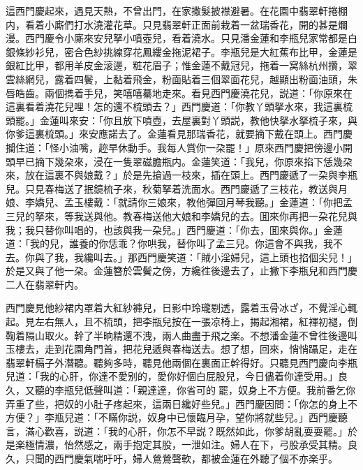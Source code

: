 這西門慶起來，遇見天熱，不曾出門，在家撒髮披襟避暑。在花園中翡翠軒捲棚内，看着小廝們打水澆灌花草。只見翡翠軒正面前栽着一盆瑞香花，開的甚是爛漫。西門慶令小廝來安兒拏小噴壺兒，看着澆水。只見潘金蓮和李瓶兒家常都是白銀條紗衫兒，密合色紗挑線穿花鳳縷金拖泥裙子。李瓶兒是大紅蕉布比甲，金蓮是銀紅比甲，都用羊皮金滚邊，粧花眉子；惟金蓮不戴冠兒，拖着一窝絲杭州攢，翠雲絲網兒，露着四鬢，上黏着飛金，粉面貼着三個翠面花兒，越顯出粉面油頭，朱唇皓齒。兩個擕着手兒，笑嘻嘻驀地走來。看見西門慶澆花兒，説道：「你原來在這裏看着澆花兒哩！怎的還不梳頭去？」西門慶道：「你教丫頭拏水來，我這裏梳頭罷。」金蓮叫來安：「你且放下噴壺，去屋裏對丫頭説，教他快拏水拏梳子來，與你爹這裏梳頭。」來安應諾去了。金蓮看見那瑞香花，就要摘下戴在頭上。西門慶攔住道：「怪小油嘴，趂早休動手。我每人賞你一朶罷！」原來西門慶把傍邊小開頭早已摘下幾朶來，浸在一隻翠磁膽瓶内。金蓮笑道：「我兒，你原來掐下恁幾朶來，放在這裏不與娘戴？」於是先搶過一枝來，插在頭上。西門慶遞了一朶與李瓶兒。只見春梅送了抿鏡梳子來，秋菊拏着洗面水。西門慶遞了三枝花，教送與月娘、李嬌兒、孟玉樓戴：「就請你三娘來，教他彈回月琴我聽。」金蓮道：「你把孟三兒的拏來，等我送與他。教春梅送他大娘和李嬌兒的去。囬來你再把一朶花兒與我；我只替你叫唱的，也該與我一朶兒。」西門慶道：「你去，囬來與你。」金蓮道：「我的兒，誰養的你恁乖？你哄我，替你叫了孟三兒。你這會不與我，我不去。你與了我，我纔叫去。」那西門慶笑道：「賊小淫婦兒，這上頭也掐個尖兒！」於是又與了他一朶。金蓮簪於雲鬢之傍，方纔徃後邊去了，止撇下李瓶兒和西門慶二人在翡翠軒内。

西門慶見他紗裙内罩着大紅紗褲兒，日影中玲瓏剔透，露着玉骨冰ざ，不覺淫心輒起。見左右無人，且不梳頭，把李瓶兒按在一張凉椅上，揭起湘裙，紅褌初褪，倒鞠着隔山取火。幹了半晌精還不洩，兩人曲盡于飛之楽。不想潘金蓮不曾徃後邊叫玉樓去，走到花園角門首，把花兒遞與春梅送去。想了想，回來，悄悄躡足，走在翡翠軒槅子外潛聽。聽夠多時，聽見他兩個在裏面正幹得好。只聽見西門慶向李瓶兒道：「我的心肝，你達不愛别的，愛你好個白屁股兒，今日儘着你達受用。」良久，又聽的李瓶兒低聲叫道：「親達達，你省可的𢵞罷，奴身上不方便。我前番乞你弄重了些，把奴的小肚子疼起來，這兩日纔好些兒。」西門慶因問：「你怎的身上不方便？」李瓶兒道：「不瞞你説，奴身中已懷臨月孕，望你將就些兒。」西門慶聽言，滿心歡喜，説道：「我的心肝，你怎不早説？既然如此，你爹胡亂耍耍罷。」於是楽極情濃，怡然感之，兩手抱定其股，一泄如注。婦人在下，弓股承受其精。良久，只聞的西門慶氣喘吁吁，婦人鶯鶯聲軟，都被金蓮在外聽了個不亦楽乎。

